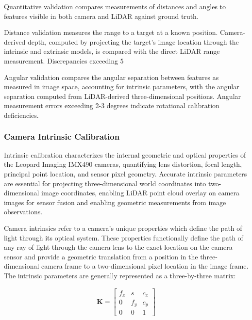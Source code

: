 \documentclass{erauthesis}
\begin{document}
Quantitative validation compares measurements of distances and angles to features visible in both camera and LiDAR against ground truth.

Distance validation measures the range to a target at a known position.
Camera-derived depth, computed by projecting the target's image location through the intrinsic and extrinsic models, is compared with the direct LiDAR range measurement.
Discrepancies exceeding 5%

Angular validation compares the angular separation between features as measured in image space, accounting for intrinsic parameters, with the angular separation computed from LiDAR-derived three-dimensional positions.
Angular measurement errors exceeding 2-3 degrees indicate rotational calibration deficiencies.

\subsubsection{Camera Intrinsic Calibration} \label{HDR_intrinsic}


Intrinsic calibration characterizes the internal geometric and optical properties of the Leopard Imaging IMX490 cameras, quantifying lens distortion, focal length, principal point location, and sensor pixel geometry.
Accurate intrinsic parameters are essential for projecting three-dimensional world coordinates into two-dimensional image coordinates, enabling LiDAR point cloud overlay on camera images for sensor fusion and enabling geometric measurements from image observations.

Camera intrinsics refer to a camera's unique properties which define the path of light through its optical system.
These properties functionally define the path of any ray of light through the camera lens to the exact location on the camera sensor and provide a geometric translation from a position in the three-dimensional camera frame to a two-dimensional pixel location in the image frame.
The intrinsic parameters are generally represented as a three-by-three matrix:

\begin{equation} \label{eq:K_matrix}
\begin{split}
    \mathbf{K} = \begin{bmatrix} f_x & s & c_x \\ 0 & f_y & c_y \\ 0 & 0 & 1 \end{bmatrix}
    \end{split}
\end{equation}
\end{document}
